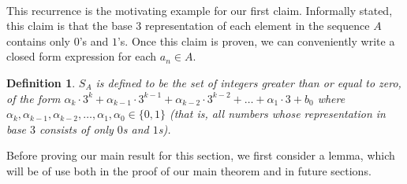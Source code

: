 \documentclass[11pt,letterpaper,twoside,english]{article}
\theoremstyle{theorem}
\newtheorem{definition}[theorem]{Definition}
\theoremstyle{remark}
\begin{document}
 
 \

This recurrence is the motivating example for our first claim. Informally stated, this claim is that the base $3$ representation of each element in the sequence $A$ contains only $0$'s and $1$'s. Once this claim is proven, we can conveniently write a closed form expression for each $a_n\in A$.



\begin{definition} \label{def:S_A}
$S_A$ is defined to be the set of integers greater than or equal to zero, of the form $\alpha_k \cdot 3^k + \alpha_{k-1} \cdot 3^{k-1} + \alpha_{k-2} \cdot 3^{k-2} + \ldots + \alpha_1 \cdot 3 + b_0$ where $\alpha_k, \alpha_{k-1}, \alpha_{k-2}, \ldots, \alpha_1, \alpha_0 \in \{0, 1\}$ (that is, all numbers whose representation in base $3$ consists of only $0$s and $1$s). 
\end{definition}

Before proving our main result for this section, we first consider a lemma, which will be of use both in the proof of our main theorem and in future sections.
\end{document}
